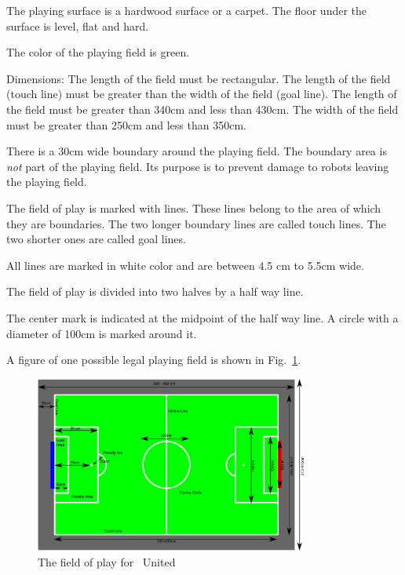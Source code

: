 \documentclass[12pt]{hurocup}
\begin{document}
\begin{lawlist}[US]
  
\item The playing surface is a hardwood surface or a carpet. The floor
  under the surface is level, flat and hard.

\item The color of the playing field is green.
  
\item Dimensions: The length of the field must be rectangular. The
  length of the field (touch line) must be greater than the width of
  the field (goal line). The length of the field must be greater than
  340cm and less than 430cm. The width of the field must be greater
  than 250cm and less than 350cm.
 
\item There is a 30cm wide boundary around the playing field. The
  boundary area is \emph{not} part of the playing field. Its purpose
  is to prevent damage to robots leaving the playing field.
 
\item The field of play is marked with lines. These lines belong to
  the area of which they are boundaries. The two longer boundary lines
  are called touch lines. The two shorter ones are called goal lines.

\item All lines are marked in white color and are between 4.5 cm to
  5.5cm wide.

\item The field of play is divided into two halves by a half way
  line. 

\item The center mark is indicated at the midpoint of the half way
  line. A circle with a diameter of 100cm is marked around it.
  
\item A figure of one possible legal playing field is shown in
  Fig.~\ref{fig:field-hurocup}.
  
  \begin{figure}
    \begin{center}
      \includegraphics[width=0.8\textwidth]{Figures/hurocup-field}
      \caption{The field of play for \HuroCup\ United}
      \label{fig:field-hurocup}
    \end{center}
  \end{figure}
  

\end{lawlist}
\end{document}
